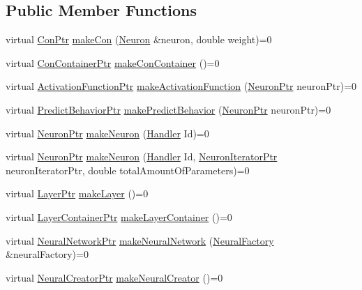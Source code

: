 \subsection*{Public Member Functions}
\begin{DoxyCompactItemize}
\item 
virtual \hyperlink{_a_m_o_r_e_8h_a169bb8e5f26ce70bf2b10dec2fb5ee50}{ConPtr} \hyperlink{class_neural_factory_a0d11171bb9e5d09544e8d58a9324b923}{makeCon} (\hyperlink{class_neuron}{Neuron} \&neuron, double weight)=0
\item 
virtual \hyperlink{_a_m_o_r_e_8h_a1021dbaf961d1c8da6d58a8566e5778b}{ConContainerPtr} \hyperlink{class_neural_factory_a4fa5f4f57a2551c95481146b1a0c83d7}{makeConContainer} ()=0
\item 
virtual \hyperlink{_a_m_o_r_e_8h_a77602a0277a02e5769c3df0adc669b17}{ActivationFunctionPtr} \hyperlink{class_neural_factory_a678ec16456e5772a2c188c475a78c588}{makeActivationFunction} (\hyperlink{_a_m_o_r_e_8h_ac1ea936c2c7728eb382278131652fef4}{NeuronPtr} neuronPtr)=0
\item 
virtual \hyperlink{_a_m_o_r_e_8h_a1fb2f1f8fdf1e08c42ef4bdce436af93}{PredictBehaviorPtr} \hyperlink{class_neural_factory_a3d49ef5f05c82cc2c614e884ed3a27d5}{makePredictBehavior} (\hyperlink{_a_m_o_r_e_8h_ac1ea936c2c7728eb382278131652fef4}{NeuronPtr} neuronPtr)=0
\item 
virtual \hyperlink{_a_m_o_r_e_8h_ac1ea936c2c7728eb382278131652fef4}{NeuronPtr} \hyperlink{class_neural_factory_a12abbf93f829aab585975f157c8c98f7}{makeNeuron} (\hyperlink{_a_m_o_r_e_8h_abc871abb71cff6655b8172ee7240b8ef}{Handler} Id)=0
\item 
virtual \hyperlink{_a_m_o_r_e_8h_ac1ea936c2c7728eb382278131652fef4}{NeuronPtr} \hyperlink{class_neural_factory_a19c08ba7ad05ef7af05f7595dda2100b}{makeNeuron} (\hyperlink{_a_m_o_r_e_8h_abc871abb71cff6655b8172ee7240b8ef}{Handler} Id, \hyperlink{_a_m_o_r_e_8h_aa794539c0a68e4eb451e7a2cc6294acc}{NeuronIteratorPtr} neuronIteratorPtr, double totalAmountOfParameters)=0
\item 
virtual \hyperlink{_a_m_o_r_e_8h_acce4b66db3921b7326fbe1a04a56e5fc}{LayerPtr} \hyperlink{class_neural_factory_a1a02bc2427430c4085654a72a03a5f4f}{makeLayer} ()=0
\item 
virtual \hyperlink{_a_m_o_r_e_8h_af261b546158af61fc27686fb926961f2}{LayerContainerPtr} \hyperlink{class_neural_factory_a10b5056a57cc3fef56c66da1ad367fc7}{makeLayerContainer} ()=0
\item 
virtual \hyperlink{_a_m_o_r_e_8h_a7adadf1c313313507b00cd1193db29a1}{NeuralNetworkPtr} \hyperlink{class_neural_factory_a15b9308e868ca439869b1d68afabfcde}{makeNeuralNetwork} (\hyperlink{class_neural_factory}{NeuralFactory} \&neuralFactory)=0
\item 
virtual \hyperlink{_a_m_o_r_e_8h_aefebabe3353f684b7708712480c15699}{NeuralCreatorPtr} \hyperlink{class_neural_factory_a2c7502e1bf81d3fc33284123d733428e}{makeNeuralCreator} ()=0
\end{DoxyCompactItemize}


